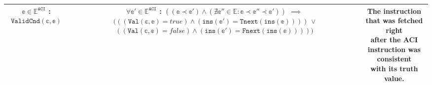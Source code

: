 \documentclass{article}
\begin{document}
\begin{center}
\begin{tabular}{||c | c | c ||}
 \makecell{$\mathbb{e} \in \mathbb{E}^\texttt{ACI}$ :\\$\texttt{ValidCnd}(\mathbb{c},\mathbb{e})$} & \makecell{$\forall \mathbb{e}' \in \mathbb{E}^\texttt{ACI}$ :\\$((\mathbb{e} \prec \mathbb{e}') \wedge (\nexists \mathbb{e}'' \in \mathbb{E} : \mathbb{e} \prec \mathbb{e''} \prec \mathbb{e'}))$\\$\implies$\\$(((\texttt{Val}(\mathbb{c},\mathbb{e}) = true) \wedge (\texttt{ins}(\mathbb{e'}) = \texttt{Tnext}(\texttt{ins}(\mathbb{e}))))$\\$\vee$\\$((\texttt{Val}(\mathbb{c},\mathbb{e}) = false) \wedge (\texttt{ins}(\mathbb{e}') = \texttt{Fnext}(\texttt{ins}(\mathbb{e})))))$} & \makecell{The instruction that was fetched right\\ after the ACI instruction was consistent\\ with its truth value.} \\
 \hline
 
 \hline
\end{tabular}
\end{center}
\end{document}
